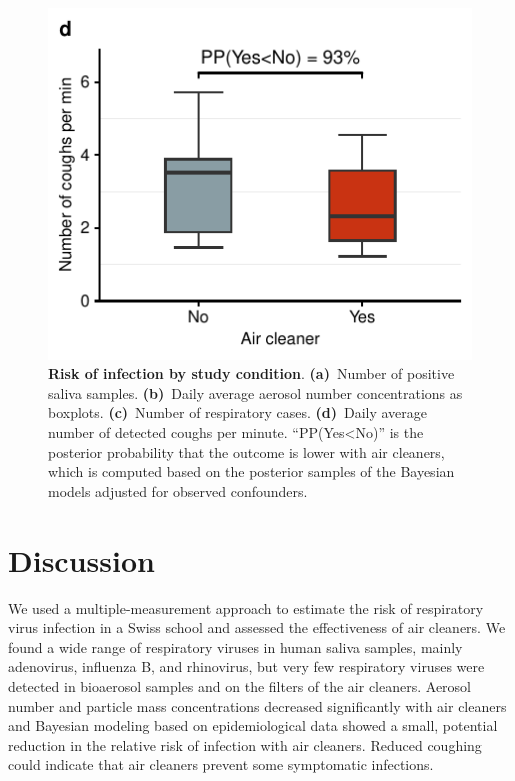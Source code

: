 \documentclass[fleqn,11pt]{wlscirep}
\begin{document}
\begin{figure}[!htpb]
    \includegraphics{../../results/cough-data/coughs-frequency-by-condition.pdf}
    \caption{\textbf{Risk of infection by study condition}. \textbf{(a)}~Number of positive saliva samples. \textbf{(b)}~Daily average aerosol number concentrations as boxplots. \textbf{(c)}~Number of respiratory cases. \textbf{(d)}~Daily average number of detected coughs per minute. ``PP(Yes<No)'' is the posterior probability that the outcome is lower with air cleaners, which is computed based on the posterior samples of the Bayesian models adjusted for observed confounders.}
    \label{fig:infection-risk}
\end{figure}

\FloatBarrier

\newpage

\section{Discussion}


We used a multiple-measurement approach to estimate the risk of respiratory virus infection in a Swiss school and assessed the effectiveness of air cleaners. We found a wide range of respiratory viruses in human saliva samples, mainly adenovirus, influenza B, and rhinovirus, but very few respiratory viruses were detected in bioaerosol samples and on the filters of the air cleaners. Aerosol number and particle mass concentrations decreased significantly with air cleaners and Bayesian modeling based on epidemiological data showed a small, potential reduction in the relative risk of infection with air cleaners. Reduced coughing could indicate that air cleaners prevent some symptomatic infections.
\end{document}
